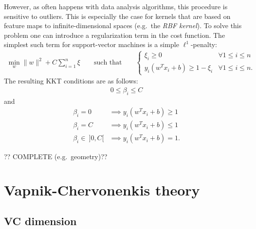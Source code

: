     However, as often happens with data analysis algorithms, this procedure is sensitive to outliers. This is especially the case for kernels that are based on feature maps to infinite-dimensional spaces (e.g.~the \textit{RBF kernel}). To solve this problem one can introduce a regularization term in the cost function. The simplest such term for support-vector machines is a simple $\ell^1$-penalty:
    \begin{gather}
        \min_w\|w\|^2 + C\sum_{i=1}^n\xi \qquad\text{such that}\qquad
        \begin{cases}
            \xi_i\geq0&\forall 1\leq i\leq n\\
            y_i(w^Tx_i+b)\geq1-\xi_i&\forall 1\leq i\leq n.
        \end{cases}
    \end{gather}
    The resulting KKT conditions are as follows:
    \begin{gather}
        0\leq\beta_i\leq C
    \end{gather}
    and
    \begin{align}
        \beta_i = 0&\implies y_i(w^Tx_i+b)\geq1\\
        \beta_i = C&\implies y_i(w^Tx_i+b)\leq1\\
        \beta_i\in\ ]0,C[&\implies y_i(w^Tx_i+b)=1.
    \end{align}

    ?? COMPLETE (e.g.~geometry)??

\section{Vapnik-Chervonenkis theory}
\subsection{VC dimension}

